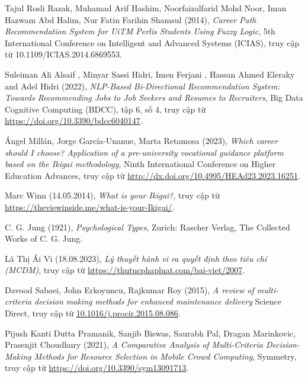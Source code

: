 \begin{thebibliography}{99}
    Tajul Rosli Razak, Muhamad Arif Hashim, Noorfaizalfarid Mohd Noor, Iman Hazwam Abd Halim, Nur Fatin Farihin Shamsul (2014),
    \emph{Career Path Recommendation System for UiTM Perlis Students Using Fuzzy Logic},
    5th International Conference on Intelligent and Advanced Systems (ICIAS),
    truy cập từ 10.1109/ICIAS.2014.6869553.

    Suleiman Ali Alsaif , Minyar Sassi Hidri, Imen Ferjani , Hassan Ahmed Eleraky and Adel Hidri (2022),
    \emph{NLP-Based Bi-Directional Recommendation System: Towards Recommending Jobs to Job Seekers and Resumes to Recruiters},
    Big Data Cognitive Computing (BDCC),
    tập 6, số 4,
    truy cập từ \href{https://doi.org/10.3390/bdcc6040147}{\color{black}https://doi.org/10.3390/bdcc6040147}.

    Ángel Millán, Jorge García-Unanue, Marta Retamosa (2023),
    \emph{Which career should I choose? Application of a pre-university vocational guidance platform based on the Ikigai methodology},
     Ninth International Conference on Higher Education Advances,
    truy cập từ \href{http://dx.doi.org/10.4995/HEAd23.2023.16251}{\color{black}http://dx.doi.org/10.4995/HEAd23.2023.16251}.

    Marc Winn (14.05.2014),
    \emph{What is your Ikigai?},
    truy cập từ \href{https://theviewinside.me/what-is-your-Ikigai/}{\color{black}https://theviewinside.me/what-is-your-Ikigai/}.

    C. G. Jung (1921),
    \emph{Psychological Types},
    Zurich: Rascher Verlag,
    The Collected Works of C. G. Jung.

    Lã Thị Ái Vi (18.08.2023),
    \emph{Lý thuyết hành vi ra quyết định theo tiêu chí (MCDM)},
    truy cập từ \href{https://thutucphapluat.com/bai-viet/2007}
    {\color{black}https://thutucphapluat.com/bai-viet/2007}.

    Davood Sabaei, John Erkoyuncu, Rajkumar Roy (2015),
    \emph{A review of multi-criteria decision making methods for enhanced maintenance delivery}
    Science Direct,
    truy cập từ \href{10.1016/j.procir.2015.08.086}{\color{black}10.1016/j.procir.2015.08.086}.

    Pijush Kanti Dutta Pramanik, Sanjib Biswas, Saurabh Pal, Dragan Marinkovic, Prasenjit Choudhury (2021),
    \emph{A Comparative Analysis of Multi-Criteria Decision-Making Methods for Resource Selection in Mobile Crowd Computing},
    Symmetry,
    truy cập từ \href{https://doi.org/10.3390/sym13091713}{\color{black}https://doi.org/10.3390/sym13091713}.


\end{thebibliography}

